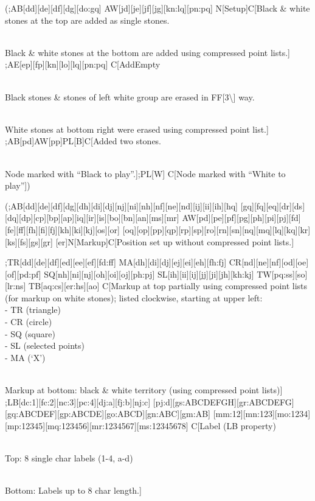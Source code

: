 (;AB{[}dd{]}{[}de{]}{[}df{]}{[}dg{]}{[}do:gq{]}
AW{[}jd{]}{[}je{]}{[}jf{]}{[}jg{]}{[}kn:lq{]}{[}pn:pq{]}
N{[}Setup{]}C{[}Black \& white stones at the top are added as single
stones.\\
\strut \\
Black \& white stones at the bottom are added using compressed point
lists.{]} ;AE{[}ep{]}{[}fp{]}{[}kn{]}{[}lo{]}{[}lq{]}{[}pn:pq{]}
C{[}AddEmpty\\
\strut \\
Black stones \& stones of left white group are erased in
FF{[}3\textbackslash{]} way.\\
\strut \\
White stones at bottom right were erased using compressed point list.{]}
;AB{[}pd{]}AW{[}pp{]}PL{[}B{]}C{[}Added two stones.\\
\strut \\
Node marked with ``Black to play''.{]};PL{[}W{]} C{[}Node marked with
``White to play''{]})

(;AB{[}dd{]}{[}de{]}{[}df{]}{[}dg{]}{[}dh{]}{[}di{]}{[}dj{]}{[}nj{]}{[}ni{]}{[}nh{]}{[}nf{]}{[}ne{]}{[}nd{]}{[}ij{]}{[}ii{]}{[}ih{]}{[}hq{]}
{[}gq{]}{[}fq{]}{[}eq{]}{[}dr{]}{[}ds{]}{[}dq{]}{[}dp{]}{[}cp{]}{[}bp{]}{[}ap{]}{[}iq{]}{[}ir{]}{[}is{]}{[}bo{]}{[}bn{]}{[}an{]}{[}ms{]}{[}mr{]}
AW{[}pd{]}{[}pe{]}{[}pf{]}{[}pg{]}{[}ph{]}{[}pi{]}{[}pj{]}{[}fd{]}{[}fe{]}{[}ff{]}{[}fh{]}{[}fi{]}{[}fj{]}{[}kh{]}{[}ki{]}{[}kj{]}{[}os{]}{[}or{]}
{[}oq{]}{[}op{]}{[}pp{]}{[}qp{]}{[}rp{]}{[}sp{]}{[}ro{]}{[}rn{]}{[}sn{]}{[}nq{]}{[}mq{]}{[}lq{]}{[}kq{]}{[}kr{]}{[}ks{]}{[}fs{]}{[}gs{]}{[}gr{]}
{[}er{]}N{[}Markup{]}C{[}Position set up without compressed point
lists.{]}

;TR{[}dd{]}{[}de{]}{[}df{]}{[}ed{]}{[}ee{]}{[}ef{]}{[}fd:ff{]}
MA{[}dh{]}{[}di{]}{[}dj{]}{[}ej{]}{[}ei{]}{[}eh{]}{[}fh:fj{]}
CR{[}nd{]}{[}ne{]}{[}nf{]}{[}od{]}{[}oe{]}{[}of{]}{[}pd:pf{]}
SQ{[}nh{]}{[}ni{]}{[}nj{]}{[}oh{]}{[}oi{]}{[}oj{]}{[}ph:pj{]}
SL{[}ih{]}{[}ii{]}{[}ij{]}{[}jj{]}{[}ji{]}{[}jh{]}{[}kh:kj{]}
TW{[}pq:ss{]}{[}so{]}{[}lr:ns{]} TB{[}aq:cs{]}{[}er:hs{]}{[}ao{]}
C{[}Markup at top partially using compressed point lists (for markup on
white stones); listed clockwise, starting at upper left:\\
- TR (triangle)\\
- CR (circle)\\
- SQ (square)\\
- SL (selected points)\\
- MA (`X')\\
\strut \\
Markup at bottom: black \& white territory (using compressed point
lists){]}
;LB{[}dc:1{]}{[}fc:2{]}{[}nc:3{]}{[}pc:4{]}{[}dj:a{]}{[}fj:b{]}{[}nj:c{]}
{[}pj:d{]}{[}gs:ABCDEFGH{]}{[}gr:ABCDEFG{]}{[}gq:ABCDEF{]}{[}gp:ABCDE{]}{[}go:ABCD{]}{[}gn:ABC{]}{[}gm:AB{]}
{[}mm:12{]}{[}mn:123{]}{[}mo:1234{]}{[}mp:12345{]}{[}mq:123456{]}{[}mr:1234567{]}{[}ms:12345678{]}
C{[}Label (LB property)\\
\strut \\
Top: 8 single char labels (1-4, a-d)\\
\strut \\
Bottom: Labels up to 8 char length.{]}

